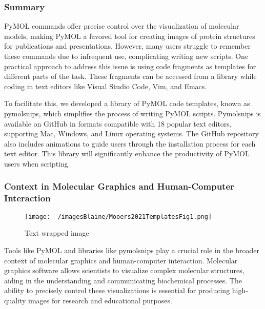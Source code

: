 

\subsubsection*{Summary}
PyMOL commands offer precise control over the visualization of molecular models, making PyMOL a favored tool for creating images of protein structures for publications and presentations. However, many users struggle to remember these commands due to infrequent use, complicating writing new scripts. 
One practical approach to address this issue is using code fragments as templates for different parts of the task. 
These fragments can be accessed from a library while coding in text editors like Visual Studio Code, Vim, and Emacs.


To facilitate this, we developed a library of PyMOL code templates, known as pymolsnips, which simplifies the process of writing PyMOL scripts. 
Pymolsnips is available on GitHub in formats compatible with 18 popular text editors, supporting Mac, Windows, and Linux operating systems. 
The GitHub repository also includes animations to guide users through the installation process for each text editor. 
This library will significantly enhance the productivity of PyMOL users when scripting.


\subsubsection*{Context in Molecular Graphics and Human-Computer Interaction}
\begin{wrapfigure}{l}{0.35\textwidth} %
\vspace{-10pt}
\texttt{[image: ~/imagesBlaine/Mooers2021TemplatesFig1.png]}
\caption{\footnotesize Text wrapped image }
\vspace{-10pt}
\label{fig:preview}
\end{wrapfigure}

Tools like PyMOL and libraries like pymolsnips play a crucial role in the broader context of molecular graphics and human-computer interaction. 
Molecular graphics software allows scientists to visualize complex molecular structures, aiding in the understanding and communicating biochemical processes. 
The ability to precisely control these visualizations is essential for producing high-quality images for research and educational purposes.


